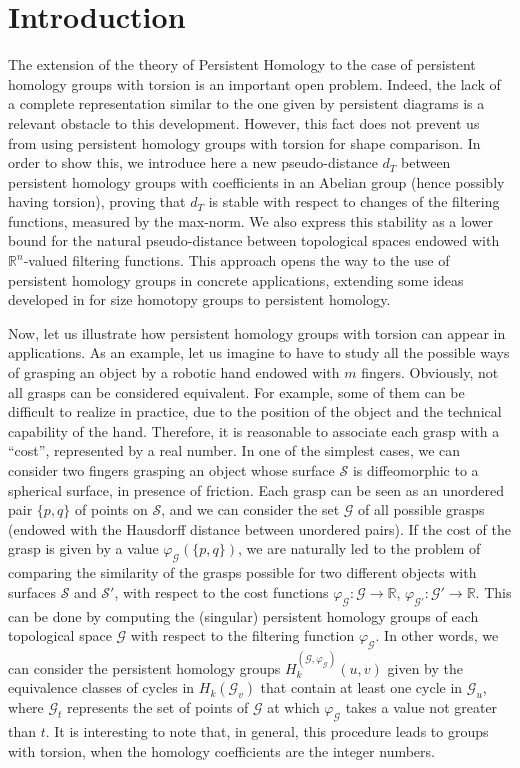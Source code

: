 \documentclass{amsart}
\theoremstyle{definition}
\theoremstyle{remark}
\newcommand{\p}{\varphi}
\newcommand{\R}{\mathbb{R}}
\numberwithin{equation}{section}
\begin{document}
\section*{Introduction}
The extension of the theory of Persistent Homology to the case of persistent homology groups with torsion is an important open problem. Indeed, the lack of a complete representation similar to the one given by persistent diagrams is a relevant obstacle to this development. However,  this fact does not prevent us from using persistent homology groups with torsion for shape comparison. In order to show this, we introduce here a new pseudo-distance $d_T$ between persistent homology groups with coefficients in an Abelian group (hence possibly having torsion), proving that $d_T$ is stable with respect to changes of the filtering functions, measured by the max-norm. We also express this stability as a lower bound for the natural pseudo-distance between topological spaces endowed with $\R^n$-valued filtering functions. This approach opens the way to the use of persistent homology groups in concrete applications, extending some ideas developed in \cite{FrMu99} for size homotopy groups to persistent homology.


Now, let us illustrate how persistent homology groups with torsion can appear in applications. As an example, let us imagine to have to study all the possible ways of grasping an object by a robotic hand endowed with $m$ fingers. Obviously, not all grasps can be considered equivalent. For example, some of them can be difficult to realize in practice, due to the position of the object and the technical capability of the hand. Therefore, it is reasonable to associate each grasp with a ``cost'', represented by a real number. In one of the simplest cases, we can consider two fingers grasping an object whose surface $\mathcal{S}$ is diffeomorphic to a spherical surface, in presence of friction. Each grasp can be seen as an unordered pair $\{p,q\}$ of points on $\mathcal{S}$, and we can consider the set $\mathcal{G}$ of all possible grasps (endowed with the Hausdorff distance between unordered pairs). If the cost of the grasp is given by a value $\varphi_\mathcal{G}(\{p,q\})$, we are naturally led to the problem of comparing the similarity of the grasps possible for two different objects with surfaces $\mathcal{S}$ and $\mathcal{S}'$, with respect to the cost functions $\varphi_\mathcal{G}:\mathcal{G}\to \R$, $\varphi_{\mathcal{G}'}:\mathcal{G}'\to \R$. This can be done by computing the (singular) persistent homology groups of each topological space $\mathcal{G}$ with respect to the filtering function $\varphi_\mathcal{G}$. In other words, we can consider the persistent homology groups ${H}_k^{(\mathcal{G},\p_\mathcal{G})}(u,v)$ given by the equivalence classes of cycles in ${H}_k(\mathcal{G}_v)$ that contain at least one cycle in $\mathcal{G}_u$, where $\mathcal{G}_t$ represents the set of points of $\mathcal{G}$ at which $\p_\mathcal{G}$ takes a value not greater than $t$. It is interesting to note that, in general, this procedure leads to groups with torsion, when the homology coefficients are the integer numbers.
\end{document}
